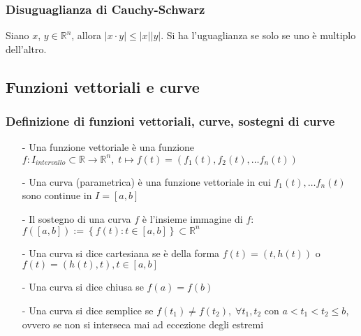 \documentclass[a4paper]{article}
\newcommand\R{\mathbb{R}}     %
\newcommand\Rd{\mathbb{R}^2}  %
\newcommand\Rt{\mathbb{R}^3}  %
\newcommand\Rn{\mathbb{R}^n}  %
\begin{document}
\subsubsection*{Disuguaglianza di Cauchy-Schwarz}
Siano \(x\), \(y \in \Rn\), allora \(\left| x \cdot y \right| \leq \left| x \right| \left| y \right|\). Si ha l'uguaglianza se
solo se uno è multiplo dell'altro.


\newpage

\subsection{Funzioni vettoriali e curve}
\subsubsection*{Definizione di funzioni vettoriali, curve, sostegni di curve}
\begin{itemize}[topsep=3pt, itemsep=0pt]
	\item[-] Una funzione vettoriale è una funzione \(f: I_{intervallo} \subset \R \rightarrow \Rn, \; t \mapsto f(t) = \left(f_1(t), f_2(t), \dots f_n(t)\right)\)
	\item[-] Una curva (parametrica) è una funzione vettoriale in cui \(f_1(t), \dots f_n(t)\) sono continue in \(I = \left[a,b\right]\)
	\item[-] Il sostegno di una curva \(f\) è l'insieme immagine di \(f\): \(f\left(\left[a,b\right]\right) := \left\{f(t) : t \in \left[a,b\right]\right\} \subset \Rn\)
	\item[-] Una curva si dice cartesiana se è della forma \(f(t) = \left(t, h(t)\right)\) o \(f(t) = \left(h(t),t\right), t \in \left[a,b\right]\)
	\item[-] Una curva si dice chiusa se \(f(a) = f(b)\)
	\item[-] Una curva si dice semplice se \(f(t_1) \neq f(t_2), \; \forall t_1,t_2\) con \(a < t_1 < t_2 \leq b\), ovvero se non si interseca mai ad eccezione degli estremi
\end{itemize}
\end{document}
